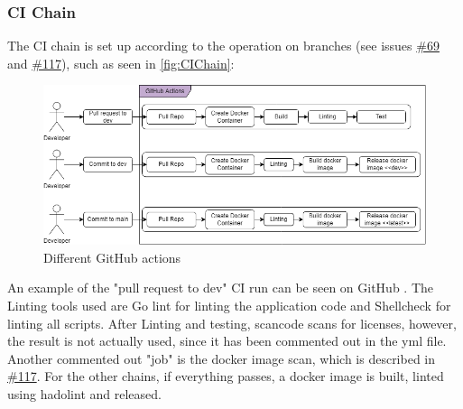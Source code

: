 \subsubsection{CI Chain}
The CI chain is set up according to the operation on branches (see issues \href{https://github.com/DevelOpsITU/MiniTwit/issues/69}{\#69} and \href{https://github.com/DevelOpsITU/MiniTwit/issues/117}{\#117}), such as seen in \autoref{fig:CIChain}: 
\begin{figure}[H]
    \centering
    \includegraphics[width=\linewidth]{images/diagrams/CI_Chain.png}
    \caption{Different GitHub actions}
    \label{fig:CIChain}
\end{figure}
%    
%    

An example of the "pull request to dev" CI run can be seen on GitHub \cite{ci_run_example_1}.
The Linting tools used are Go lint\cite{golinter.sh} for linting the application code and Shellcheck \cite{shellchecker.sh} for linting all scripts. After Linting and testing, scancode \cite{scancode_dockerfile} scans for licenses, however, the result is not actually used, since it has been commented out in the yml file\cite{pullreq_to_dev_yml}. Another commented out "job" is the docker image scan, which is described in \href{https://github.com/DevelOpsITU/MiniTwit/issues/117}{\#117}. For the other chains, if everything passes, a docker image is built, linted using hadolint\cite{hadolint} and released. \\

